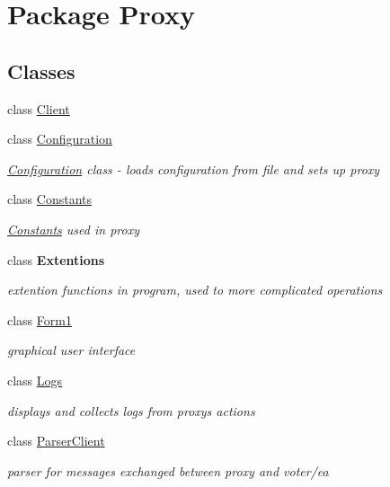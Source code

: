 \hypertarget{namespace_proxy}{}\section{Package Proxy}
\label{namespace_proxy}
\subsection*{Classes}
\begin{DoxyCompactItemize}
\item 
class \hyperlink{class_proxy_1_1_client}{Client}
\item 
class \hyperlink{class_proxy_1_1_configuration}{Configuration}
\begin{DoxyCompactList}\small\item\em \hyperlink{class_proxy_1_1_configuration}{Configuration} class -\/ loads configuration from file and sets up proxy \end{DoxyCompactList}\item 
class \hyperlink{class_proxy_1_1_constants}{Constants}
\begin{DoxyCompactList}\small\item\em \hyperlink{class_proxy_1_1_constants}{Constants} used in proxy \end{DoxyCompactList}\item 
class {\bfseries Extentions}
\begin{DoxyCompactList}\small\item\em extention functions in program, used to more complicated operations \end{DoxyCompactList}\item 
class \hyperlink{class_proxy_1_1_form1}{Form1}
\begin{DoxyCompactList}\small\item\em graphical user interface \end{DoxyCompactList}\item 
class \hyperlink{class_proxy_1_1_logs}{Logs}
\begin{DoxyCompactList}\small\item\em displays and collects logs from proxy\textquotesingle{}s actions \end{DoxyCompactList}\item 
class \hyperlink{class_proxy_1_1_parser_client}{Parser\+Client}
\begin{DoxyCompactList}\small\item\em parser for messages exchanged between proxy and voter/ea \end{DoxyCompactList}\item 

\end{DoxyCompactItemize}
